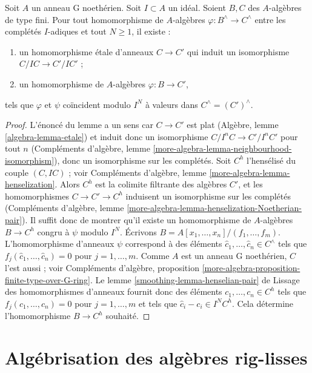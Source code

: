 \begin{lemma}
\label{lemma-fully-faithfulness}
Soit $A$ un anneau G noethérien. Soit $I \subset A$ un idéal. Soient $B, C$
des $A$-algèbres de type fini. Pour tout homomorphisme de $A$-algèbres
$\varphi : B^\wedge \to C^\wedge$ entre les complétés $I$-adiques et tout
$N \geq 1$, il existe :
\begin{enumerate}
\item un homomorphisme étale d'anneaux $C \to C'$ qui induit un isomorphisme
$C/IC \to C'/IC'$ ;
\item un homomorphisme de $A$-algèbres $\varphi : B \to C'$,
\end{enumerate}
tels que $\varphi$ et $\psi$ coïncident modulo $I^N$ à valeurs dans
$C^\wedge = (C')^\wedge$.
\end{lemma}

\begin{proof}
L'énoncé du lemme a un sens car $C \to C'$ est plat (Algèbre, lemme
\ref{algebra-lemma-etale}) et induit donc un isomorphisme
$C/I^nC \to C'/I^nC'$ pour tout $n$ (Compléments d'algèbre, lemme
\ref{more-algebra-lemma-neighbourhood-isomorphism}), donc un isomorphisme sur
les complétés. Soit $C^h$ l'hensélisé du couple $(C, IC)$ ; voir Compléments
d'algèbre, lemme \ref{more-algebra-lemma-henselization}. Alors $C^h$ est la
colimite filtrante des algèbres $C'$, et les homomorphismes
$C \to C' \to C^h$ induisent un isomorphisme sur les complétés (Compléments
d'algèbre, lemme
\ref{more-algebra-lemma-henselization-Noetherian-pair}). Il suffit donc de
montrer qu'il existe un homomorphisme de $A$-algèbres $B \to C^h$ congru à
$\psi$ modulo $I^N$. Écrivons
$B = A[x_1, \ldots, x_n]/(f_1, \ldots, f_m)$. L'homomorphisme d'anneaux
$\psi$ correspond à des éléments $\hat c_1, \ldots, \hat c_n \in C^\wedge$
tels que $f_j(\hat c_1, \ldots, \hat c_n) = 0$ pour
$j = 1, \ldots, m$. Comme $A$ est un anneau G noethérien, $C$ l'est aussi ;
voir Compléments d'algèbre, proposition
\ref{more-algebra-proposition-finite-type-over-G-ring}. Le lemme
\ref{smoothing-lemma-henselian-pair} de Lissage des homomorphismes d'anneaux
fournit donc des éléments $c_1, \ldots, c_n \in C^h$ tels que
$f_j(c_1, \ldots, c_n) = 0$ pour $j = 1, \ldots, m$ et tels que
$\hat c_i - c_i \in I^NC^h$. Cela détermine l'homomorphisme
$B \to C^h$ souhaité.
\end{proof}







\section{Algébrisation des algèbres rig-lisses}
\label{section-algebraization-rig-smooth}

